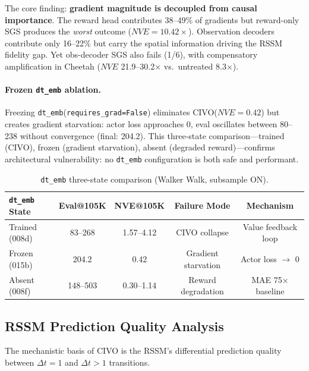 \documentclass[letterpaper]{article}
\newcommand{\civo}{CIVO\xspace}
\newcommand{\nve}{NVE\xspace}
\newcommand{\dtemb}{\texttt{dt\_emb}\xspace}
\begin{document}
The core finding: \textbf{gradient magnitude is decoupled from causal importance}. The reward head contributes 38--49\% of gradients but reward-only SGS produces the \emph{worst} outcome ($\nve = 10.42\times$). Observation decoders contribute only 16--22\% but carry the spatial information driving the RSSM fidelity gap. Yet obs-decoder SGS also fails (1/6), with compensatory amplification in Cheetah ($\nve$ 21.9--30.2$\times$ vs.\ untreated 8.3$\times$).

\paragraph{Frozen \dtemb ablation.}
Freezing \dtemb (\texttt{requires\_grad=False}) eliminates \civo ($\nve = 0.42$) but creates gradient starvation: actor loss approaches 0, eval oscillates between 80--238 without convergence (final: 204.2). This three-state comparison---trained (CIVO), frozen (gradient starvation), absent (degraded reward)---confirms architectural vulnerability: no \dtemb configuration is both safe and performant.

\begin{table}[h]
\centering
\caption{\dtemb three-state comparison (Walker Walk, subsample ON).}
\label{tab:three_state}
\begin{tabular}{lcccc}
\toprule
\dtemb State & Eval@105K & NVE@105K & Failure Mode & Mechanism \\
\midrule
Trained (008d) & 83--268 & 1.57--4.12 & CIVO collapse & Value feedback loop \\
Frozen (015b) & 204.2 & 0.42 & Gradient starvation & Actor loss $\to$ 0 \\
Absent (008f) & 148--503 & 0.30--1.14 & Reward degradation & MAE 75$\times$ baseline \\
\bottomrule
\end{tabular}
\end{table}

\subsection{RSSM Prediction Quality Analysis}

The mechanistic basis of \civo is the RSSM's differential prediction quality between $\Delta t = 1$ and $\Delta t > 1$ transitions.
\end{document}
